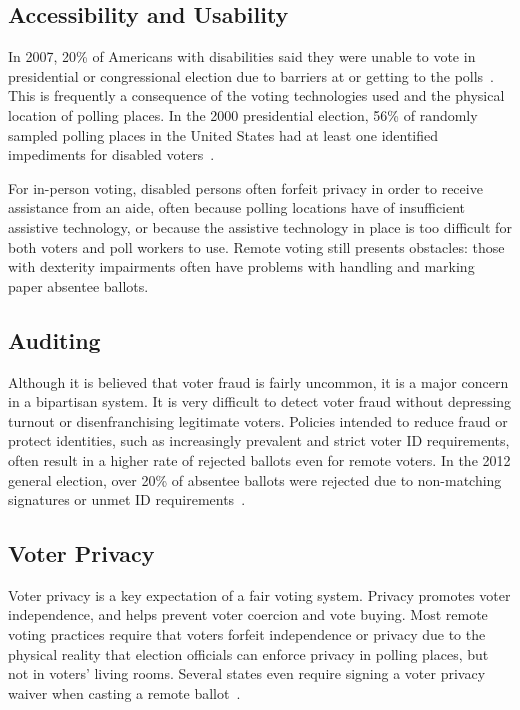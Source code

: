\subsection{Accessibility and Usability}

In 2007, 20\% of Americans with disabilities said they were unable to
vote in presidential or congressional election due to barriers at or
getting to the polls~\cite{runyan2007improving}. This is frequently a
consequence of the voting technologies used and the physical location
of polling places. In the 2000 presidential election, 56\% of randomly
sampled polling places in the United States had at least one
identified impediments for disabled voters~\cite{united2001voters}.

For in-person voting, disabled persons often forfeit privacy in order
to receive assistance from an aide, often because polling locations
have of insufficient assistive technology, or because the assistive
technology in place is too difficult for both voters and poll workers
to use. Remote voting still presents obstacles: those with dexterity
impairments often have problems with handling and marking paper
absentee ballots.

\subsection{Auditing}

Although it is believed that voter fraud is fairly uncommon, it is a
major concern in a bipartisan system. It is very difficult to detect
voter fraud without depressing turnout or disenfranchising legitimate
voters. Policies intended to reduce fraud or protect identities, such
as increasingly prevalent and strict voter ID requirements, often
result in a higher rate of rejected ballots even for remote voters. In
the 2012 general election, over 20\% of absentee ballots were rejected
due to non-matching signatures or unmet ID
requirements~\cite{eac2012survey}.


\subsection{Voter Privacy}

Voter privacy is a key expectation of a fair voting system. Privacy
promotes voter independence, and helps prevent voter coercion and vote
buying. Most remote voting practices require that voters forfeit
independence or privacy due to the physical reality that election
officials can enforce privacy in polling places, but not in voters'
living rooms. Several states even require signing a voter privacy
waiver when casting a remote ballot~\cite{smithtime}.

